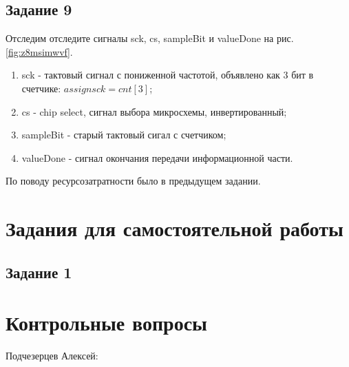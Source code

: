 \documentclass[a4paper,14pt]{article}
\begin{document}
	\subsection{Задание 9}
	
	Отследим отследите сигналы sck, cs, sampleBit и valueDone на рис. \ref{fig:z8msimwvf}.
	
	\begin{enumerate}
		
		\item sck - тактовый сигнал с пониженной частотой, объявлено как 3 бит в счетчике: $assign sck = cnt [3]$;
		
		\item cs - chip select, сигнал выбора микросхемы, инвертированный;
		
		\item sampleBit - старый тактовый сигал с счетчиком;
		
		\item valueDone - сигнал окончания передачи информационной части.
	\end{enumerate}

	По поводу ресурсозатратности было в предыдущем задании.
	
	\section{Задания для самостоятельной работы}

	\subsection{Задание 1}

	\section{Контрольные вопросы}
	
	Подчезерцев Алексей:
	
\end{document}

